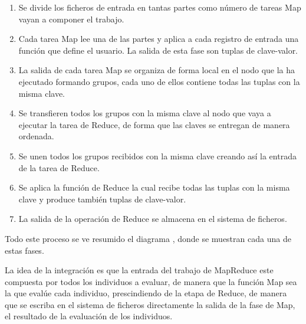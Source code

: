 \begin{enumerate}
	\item Se divide los ficheros de entrada en tantas partes como n\'umero de tareas Map vayan a componer el trabajo.
	\item Cada tarea Map lee una de las partes y aplica a cada registro de entrada una función que define el usuario. La salida de esta fase son tuplas de clave-valor.
	\item La salida de cada tarea Map se organiza de forma local en el nodo que la ha ejecutado formando grupos, cada uno de ellos contiene todas las tuplas con la misma clave.
	\item Se transfieren todos los grupos con la misma clave al nodo que vaya a ejecutar la tarea de Reduce, de forma que las claves se entregan de manera ordenada.
	\item Se unen todos los grupos recibidos con la misma clave creando así la entrada de la tarea de Reduce.
	\item Se aplica la función de Reduce la cual recibe todas las tuplas con la misma clave y produce también tuplas de clave-valor.
	\item La salida de la operación de Reduce se almacena en el sistema de ficheros.
\end{enumerate}

Todo este proceso se ve resumido el diagrama , donde se muestran cada una de estas fases.

\label{fase-map-eval}
La idea de la integración es que la entrada del trabajo de MapReduce este compuesta por todos los individuos a evaluar, de manera que la función Map sea la que evalúe cada individuo, prescindiendo de la etapa de Reduce, de manera que se escriba en el sistema de ficheros directamente la salida de la fase de Map, el resultado de la evaluación de los individuos.











